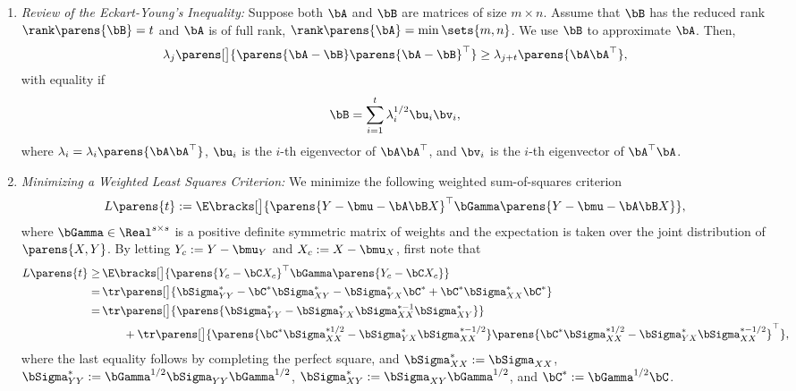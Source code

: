 \documentclass[12pt]{article}
\begin{document}
\begin{enumerate}[label=\textbf{\arabic*.}]
\begin{enumerate}
		\item \textit{Review of the Eckart-Young's Inequality:} Suppose both $\bA$ and $\bB$ are matrices of size $m \times n$. Assume that $\bB$ has the reduced rank $\rank \parens{\bB} = t$ and $\bA$ is of full rank, $\rank \parens{\bA} = \min \sets{m, n}$. We use $\bB$ to approximate $\bA$. Then, 
		\begin{align*}
			\lambda_j \parens[\big]{\parens{\bA - \bB} \parens{\bA - \bB}^\top} \ge \lambda_{j+t} \parens{\bA \bA^\top}, 
		\end{align*}
		with equality if 
		\begin{align*}
			\bB = \sum_{i=1}^t \lambda_i^{1/2} \bu_i \bv_i, 
		\end{align*}
		where $\lambda_i = \lambda_i \parens{\bA \bA^\top}$, $\bu_i$ is the $i$-th eigenvector of $\bA \bA^\top$, and $\bv_i$ is the $i$-th eigenvector of $\bA^\top \bA$. 
		
		\item \textit{Minimizing a Weighted Least Squares Criterion:} We minimize the following weighted sum-of-squares criterion 
		\begin{align}
			L \parens{t} := \E \bracks[\big]{\parens{Y - \bmu - \bA \bB X}^\top \bGamma \parens{Y - \bmu - \bA \bB X}}, 
		\end{align}
		where $\bGamma \in \Real^{s \times s}$ is a positive definite symmetric matrix of weights and the expectation is taken over the joint distribution of $\parens{X, Y}$. By letting $Y_c := Y - \bmu_Y$ and $X_c := X - \bmu_X$, first note that 
		\begin{align}
			L \parens{t} \ge & \, \E \bracks[\big]{\parens{Y_c - \bC X_c}^\top \bGamma \parens{Y_c - \bC X_c}} \nonumber \\ 
			= & \, \tr \parens[\big]{\bSigma_{YY}^* - \bC^* \bSigma_{XY}^* - \bSigma_{YX}^* \bC^* + \bC^* \bSigma_{XX}^* \bC^*} \nonumber \\ 
			= & \, \tr \parens[\big]{\parens{\bSigma_{YY}^* - \bSigma_{YX}^* \bSigma_{XX}^{*-1} \bSigma_{XY}^*}} \nonumber \\ & \qquad 
			+ \tr \parens[\big]{\parens{\bC^* \bSigma_{XX}^{*1/2} - \bSigma_{YX}^* \bSigma_{XX}^{*-1/2}} \parens{\bC^* \bSigma_{XX}^{*1/2} - \bSigma_{YX}^* \bSigma_{XX}^{*-1/2}}^\top}, 
		\end{align}
		where the last equality follows by completing the perfect square, and $\bSigma_{XX}^{*} := \bSigma_{XX}$, $\bSigma_{YY}^{*} := \bGamma^{1/2} \bSigma_{YY} \bGamma^{1/2}$, $\bSigma_{XY}^{*} := \bSigma_{XY} \bGamma^{1/2}$, and $\bC^* := \bGamma^{1/2} \bC$. 
		

\end{enumerate}
\end{enumerate}
\end{document}
